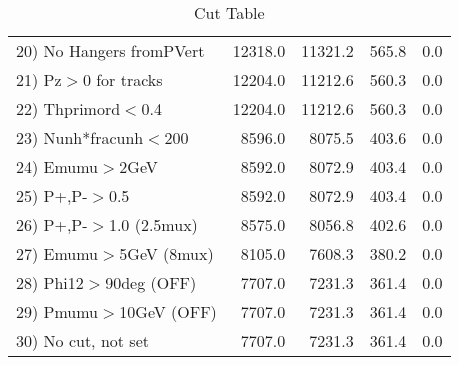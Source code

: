 \begin{table}[h!]
\begin{tabular}{||l||r|r|r|r||}
 20) No Hangers fromPVert &     12318.0 &     11321.2 &       565.8 &         0.0 \\
 21) Pz$>$0 for tracks    &     12204.0 &     11212.6 &       560.3 &         0.0 \\
 22) Thprimord$<$0.4      &     12204.0 &     11212.6 &       560.3 &         0.0 \\
 23) Nunh*fracunh$<$200   &      8596.0 &      8075.5 &       403.6 &         0.0 \\
 24) Emumu$>$2GeV         &      8592.0 &      8072.9 &       403.4 &         0.0 \\
 25) P+,P-$>$0.5          &      8592.0 &      8072.9 &       403.4 &         0.0 \\
 26) P+,P-$>$1.0 (2.5mux) &      8575.0 &      8056.8 &       402.6 &         0.0 \\
 27) Emumu$>$5GeV  (8mux) &      8105.0 &      7608.3 &       380.2 &         0.0 \\
 28) Phi12$>$90deg  (OFF) &      7707.0 &      7231.3 &       361.4 &         0.0 \\
 29) Pmumu$>$10GeV  (OFF) &      7707.0 &      7231.3 &       361.4 &         0.0 \\
 30) No cut, not set      &      7707.0 &      7231.3 &       361.4 &         0.0 \\
 \hline
 \hline
 \end{tabular}
 \caption{Cut Table \cohrp  }
 \label{tab-cut_crhop}
 \end{table}

